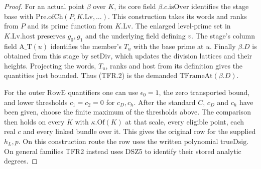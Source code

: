 \begin{proof}
For an actual point $\beta$ over $K$, its core field
$\beta.c.\mathrm{isOver}$ identifies the stage base with
$\mathrm{Pre.ofCh}(P,K.\mathrm{Lv},\ldots)$. This construction
takes its words and ranks from $P$ and its prime function from
$K.\mathrm{Lv}$. The enlarged level-prime set in
$K.\mathrm{Lv}.\mathrm{host}$ preserves $g_0,g_1$ and the
underlying field defining $v$. The stage's column field
$\mathrm{A\_T}(u)$ identifies the member's $T_u$ with the base
prime at $u$. Finally $\beta.D$ is obtained from this stage by
$\mathrm{setDiv}$, which updates the division lattices and
their heights. Projecting the words, $T_u$, ranks and host from
its definition gives the quantities just bounded. Thus (TFR.2)
is the demanded $\mathrm{TFrameAt}(\beta.D)$.

For the outer $\mathrm{RowE}$ quantifiers one can use
$\epsilon_0=1$, the zero transported bound, and lower thresholds
$c_1=c_2=0$ for $c_D,c_h$. After the standard $C$, $c_D$ and
$c_h$ have been given, choose the finite maximum of the thresholds
above. The comparison then holds on every $K$ with
$\kappa.\mathrm{Of}(K)$ at that scale, every eligible point,
each real $c$ and every linked bundle over it. This gives the
original row for the supplied $h_L,p$. On this construction
route the row uses the written polynomial $\mathrm{trueDsig}$.
On general families TFR2 instead uses DSZ5 to identify their
stored analytic degrees.
\end{proof}
